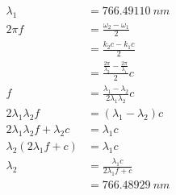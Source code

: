 \documentclass{article}
\begin{document}
\begin{align*}
  \lambda_1                             & = \qty{766.49110}{nm}                                           \\
  2 \pi f                               & = \frac{\omega_2 - \omega_1}{2}                                 \\
                                        & = \frac{k_2 c - k_1 c}{2}                                       \\
                                        & = \frac{\frac{2 \pi}{\lambda_2} - \frac{2 \pi}{\lambda_1}}{2} c \\
  f                                     & = \frac{\lambda_1 - \lambda_2}{2 \lambda_1 \lambda_2} c         \\
  2 \lambda_1 \lambda_2 f               & = (\lambda_1 - \lambda_2) c                                     \\
  2 \lambda_1 \lambda_2 f + \lambda_2 c & = \lambda_1 c                                                   \\
  \lambda_2 (2 \lambda_1 f + c)         & = \lambda_1 c                                                   \\
  \lambda_2                             & = \frac{\lambda_1 c}{2 \lambda_1 f + c}                         \\
                                        & = \qty{766.48929}{nm}
\end{align*}

\setcounter{subsection}{3}
\subsection{}
\end{document}
